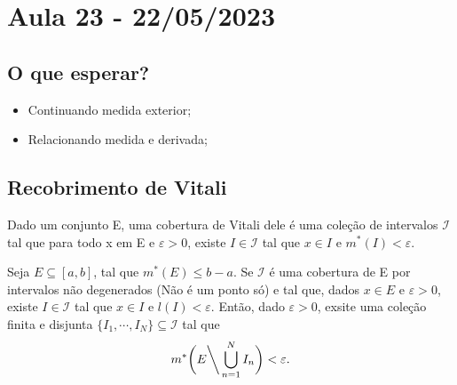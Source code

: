 \documentclass[analysis_notes.tex]{subfiles}
\begin{document}
\section{Aula 23 - 22/05/2023}
\subsection{O que esperar?}
\begin{itemize}
	\item Continuando medida exterior;
	\item Relacionando medida e derivada;
\end{itemize}
\subsection{Recobrimento de Vitali}
Dado um conjunto E, uma cobertura de Vitali dele é uma cole\c cão de intervalos
\(\mathcal{I}\) tal que para todo x em E e \(\varepsilon  > 0\), existe \(I\in \mathcal{I}\) tal que
\(x\in I\) e \(m^{*}(I) < \varepsilon .\)
\begin{lemma*}
	Seja \(E\subseteq{[a, b]}\), tal que \(m^{*}(E)\leq b-a.\) Se \(\mathcal{I}\)
	é uma cobertura de E por intervalos não degenerados (Não é um ponto só) e tal que, dados \(x\in E\) e
	\(\varepsilon >0\), existe \(I\in \mathcal{I}\) tal que \(x\in I\) e \(l(I) < \varepsilon .\)
	Então, dado \(\varepsilon  > 0\), exsite uma cole\c cão finita e disjunta \(\{I_{1}, \cdots, I_{N}\}\subseteq{\mathcal{I}}\)
	tal que
	\[
		m^{*}\biggl(E\biggl\backslash\biggr. \bigcup_{n=1}^{N}{I_{n}}\biggr) < \varepsilon .
	\]
\end{lemma*}
\end{document}
